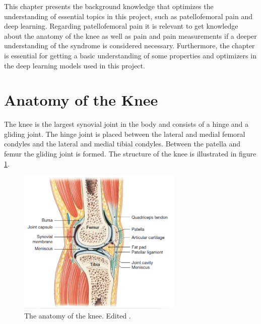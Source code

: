 

This chapter presents the background knowledge that optimizes the understanding of essential topics in this project, such as patellofemoral pain and deep learning. Regarding patellofemoral pain it is relevant to get knowledge about the anatomy of the knee as well as pain and pain measurements if a deeper understanding of the syndrome is considered necessary.  Furthermore, the chapter is essential for getting a basic understanding of some properties and optimizers in the deep learning models used in this project.


\section{Anatomy of the Knee}
The knee is the largest synovial joint in the body and consists of a hinge and a gliding joint. The hinge joint is placed between the lateral and medial femoral condyles and the lateral and medial tibial condyles. Between the patella and femur the gliding joint is formed. The structure of the knee is illustrated in figure \ref{fig:bonestruc}.\citep{Martini2012}

\begin{figure} [H]
\centering
\includegraphics[width=0.7\textwidth]{figures/bonestruc}
\caption{The anatomy of the knee. Edited \citep{Martini2012}.}
\label{fig:bonestruc}
\end{figure}

